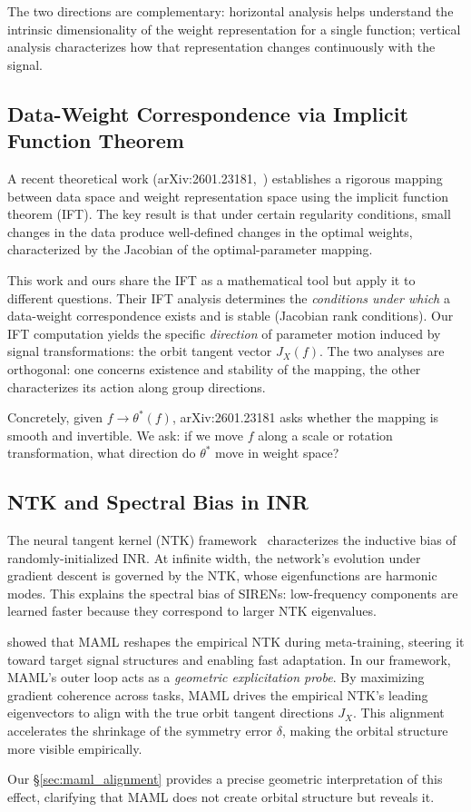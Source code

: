 The two directions are complementary: horizontal analysis helps understand the intrinsic dimensionality of the weight representation for a single function; vertical analysis characterizes how that representation changes continuously with the signal.

\subsection{Data-Weight Correspondence via Implicit Function Theorem}

A recent theoretical work (arXiv:2601.23181,~\citep{anonymous2024dataweight}) establishes a rigorous mapping between data space and weight representation space using the implicit function theorem (IFT).
The key result is that under certain regularity conditions, small changes in the data produce well-defined changes in the optimal weights, characterized by the Jacobian of the optimal-parameter mapping.

This work and ours share the IFT as a mathematical tool but apply it to different questions.
Their IFT analysis determines the \emph{conditions under which} a data-weight correspondence exists and is stable (Jacobian rank conditions).
Our IFT computation yields the specific \emph{direction} of parameter motion induced by signal transformations: the orbit tangent vector $J_X(f)$.
The two analyses are orthogonal: one concerns existence and stability of the mapping, the other characterizes its action along group directions.

Concretely, given $f \to \theta^*(f)$, arXiv:2601.23181 asks whether the mapping is smooth and invertible.
We ask: if we move $f$ along a scale or rotation transformation, what direction do $\theta^*$ move in weight space?

\subsection{NTK and Spectral Bias in INR}

The neural tangent kernel (NTK) framework~\citep{basri2020neural} characterizes the inductive bias of randomly-initialized INR.
At infinite width, the network's evolution under gradient descent is governed by the NTK, whose eigenfunctions are harmonic modes.
This explains the spectral bias of SIRENs: low-frequency components are learned faster because they correspond to larger NTK eigenvalues.

\citet{tancik2020meta} showed that MAML reshapes the empirical NTK during meta-training, steering it toward target signal structures and enabling fast adaptation.
In our framework, MAML's outer loop acts as a \emph{geometric explicitation probe}.
By maximizing gradient coherence across tasks, MAML drives the empirical NTK's leading eigenvectors to align with the true orbit tangent directions $J_X$.
This alignment accelerates the shrinkage of the symmetry error $\delta$, making the orbital structure more visible empirically.

Our \S\ref{sec:maml_alignment} provides a precise geometric interpretation of this effect, clarifying that MAML does not create orbital structure but reveals it.


